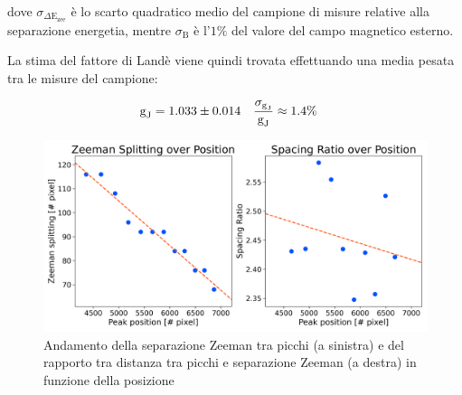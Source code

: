 \documentclass[twocolumn,10pt]{asme2ej}
\begin{document}
\noindent dove $\sigma_{\Delta \text{E}_{\text{zee}}}$ è lo scarto quadratico medio del campione di misure relative alla
separazione energetia, mentre $\sigma_{\text{B}}$ è l'$1\%$ del valore del campo magnetico esterno. 

La stima del fattore di Landè viene quindi trovata effettuando una media pesata tra le misure del campione:

\vspace{-15pt}
\begin{align*}
    \text{g}_{\text{J}} &= 1.033 \pm 0.014 & \frac{\sigma_{\text{g}_{\text{J}}}}{\text{g}_{\text{J}}} &\approx 1.4\%
    \vspace{-5pt}
\end{align*}

\begin{figure}
    \centering
    \includegraphics[width=\linewidth]{../Plots/Bon_zeeman_trend.png}
    \caption{Andamento della separazione Zeeman tra picchi (a sinistra) e del rapporto tra distanza tra picchi e separazione Zeeman (a destra) in funzione della posizione}
    \label{i:spacing_trend_Bon}
    \vspace{-10pt}
\end{figure}
\end{document}
